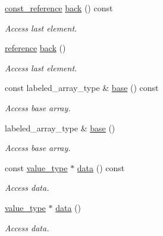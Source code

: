 \begin{DoxyCompactItemize}
\hyperlink{classIceBRG_1_1labeled__array__vecs_a5ab1d23d61a03d4f64756b59f5773d41}{const\+\_\+reference} \hyperlink{classIceBRG_1_1labeled__array__vecs_a86c46110ad7a7f3b37066f125b1742dd}{back} () const 
\begin{DoxyCompactList}\small\item\em Access last element. \end{DoxyCompactList}\item 
\hyperlink{classIceBRG_1_1labeled__array__vecs_a83e2aad33d65d344a7df84aab091e48d}{reference} \hyperlink{classIceBRG_1_1labeled__array__vecs_ae46c4984caff111cea2afbe0f9114829}{back} ()
\begin{DoxyCompactList}\small\item\em Access last element. \end{DoxyCompactList}\item 
const labeled\+\_\+array\+\_\+type \& \hyperlink{classIceBRG_1_1labeled__array__vecs_a4341cdc8903def87df4e16635c169af9}{base} () const 
\begin{DoxyCompactList}\small\item\em Access base array. \end{DoxyCompactList}\item 
labeled\+\_\+array\+\_\+type \& \hyperlink{classIceBRG_1_1labeled__array__vecs_a73765e0f5dcf4545e3c3afb2d3c7b21e}{base} ()
\begin{DoxyCompactList}\small\item\em Access base array. \end{DoxyCompactList}\item 
const \hyperlink{classIceBRG_1_1labeled__array__vecs_ac065b9242f4296223c4415479ca5f5c6}{value\+\_\+type} $\ast$ \hyperlink{classIceBRG_1_1labeled__array__vecs_a88fa4ff71cc90ea59562de3feb0d8090}{data} () const 
\begin{DoxyCompactList}\small\item\em Access data. \end{DoxyCompactList}\item 
\hyperlink{classIceBRG_1_1labeled__array__vecs_ac065b9242f4296223c4415479ca5f5c6}{value\+\_\+type} $\ast$ \hyperlink{classIceBRG_1_1labeled__array__vecs_a2629aa006cb9f09e97fad2b720f25caf}{data} ()
\begin{DoxyCompactList}\small\item\em Access data. \end{DoxyCompactList}\item 

\end{DoxyCompactItemize}
